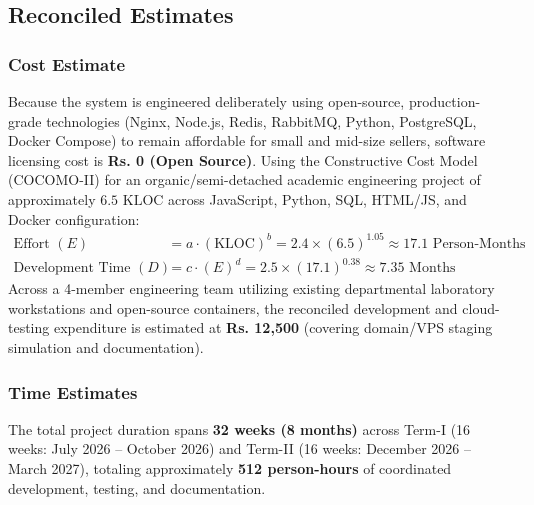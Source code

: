 \documentclass[oneside,a4paper,12pt]{report}
\begin{document}
\subsection{Reconciled Estimates}
\subsubsection{Cost Estimate}
Because the system is engineered deliberately using open-source, production-grade technologies (Nginx, Node.js, Redis, RabbitMQ, Python, PostgreSQL, Docker Compose) to remain affordable for small and mid-size sellers, software licensing cost is \textbf{Rs. 0 (Open Source)}. Using the Constructive Cost Model (COCOMO-II) for an organic/semi-detached academic engineering project of approximately $6.5\text{ KLOC}$ across JavaScript, Python, SQL, HTML/JS, and Docker configuration:
\begin{align}
\text{Effort } (E) &= a \cdot (\text{KLOC})^b = 2.4 \times (6.5)^{1.05} \approx 17.1 \text{ Person-Months} \\
\text{Development Time } (D) &= c \cdot (E)^d = 2.5 \times (17.1)^{0.38} \approx 7.35 \text{ Months}
\end{align}
Across a 4-member engineering team utilizing existing departmental laboratory workstations and open-source containers, the reconciled development and cloud-testing expenditure is estimated at \textbf{Rs. 12,500} (covering domain/VPS staging simulation and documentation).

\subsubsection{Time Estimates}
The total project duration spans \textbf{32 weeks (8 months)} across Term-I (16 weeks: July 2026 -- October 2026) and Term-II (16 weeks: December 2026 -- March 2027), totaling approximately \textbf{512 person-hours} of coordinated development, testing, and documentation.
\end{document}
